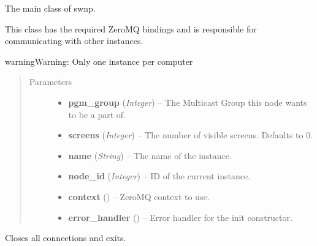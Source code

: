 \documentclass[letterpaper,10pt,english]{sphinxmanual}
\begin{document}

\begin{fulllineitems}
\label{swnp:swnp.SWNP}
The main class of swnp.

This class has the required ZeroMQ bindings and is responsible for
communicating with other instances.

\begin{notice}{warning}{Warning:}
Only one instance per computer
\end{notice}
\begin{quote}\begin{description}
\item[{Parameters}] \leavevmode\begin{itemize}
\item {} 
\textbf{pgm\_group} (\emph{Integer}) -- The Multicast Group this node wants to be a part of.

\item {} 
\textbf{screens} (\emph{Integer}) -- The number of visible screens. Defaults to 0.

\item {} 
\textbf{name} (\emph{String}) -- The name of the instance.

\item {} 
\textbf{node\_id} (\emph{Integer}) -- ID of the current instance.

\item {} 
\textbf{context} () -- ZeroMQ context to use.

\item {} 
\textbf{error\_handler} () -- Error handler for the init constructor.

\end{itemize}

\end{description}\end{quote}

\begin{fulllineitems}
\label{swnp:swnp.SWNP.close}
Closes all connections and exits.

\end{fulllineitems}



\end{fulllineitems}
\end{document}
